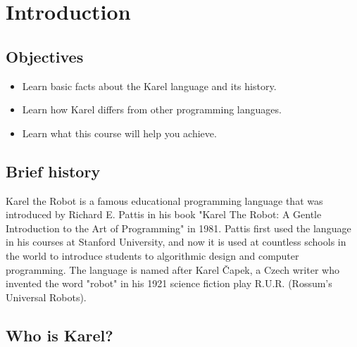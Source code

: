 \section{Introduction}

\subsection{Objectives} 

\begin{itemize}
\item Learn basic facts about the Karel language and its history. 
\item Learn how Karel differs from other programming languages.
\item Learn what this course will help you achieve.
\end{itemize}

\subsection{Brief history}

Karel the Robot is a famous educational programming language that was introduced by Richard E. 
Pattis in his book "Karel The Robot: A Gentle Introduction to the Art of Programming" in 1981. 
Pattis first used the language in his courses at Stanford University, and now it is used at 
countless schools in the world to introduce students to algorithmic design and computer programming. 
The language is named after Karel \v{C}apek, a Czech writer who invented the word "robot" in his 1921 
science fiction play R.U.R. (Rossum's Universal Robots).

\subsection{Who is Karel?}

